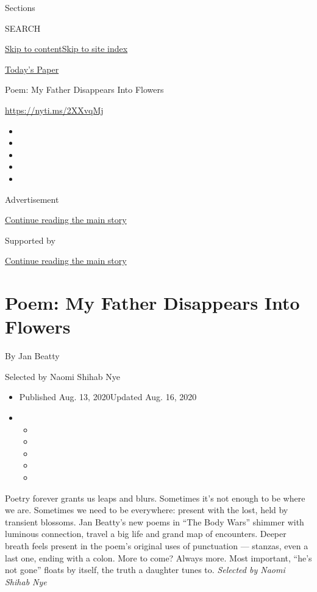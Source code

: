Sections

SEARCH

\protect\hyperlink{site-content}{Skip to
content}\protect\hyperlink{site-index}{Skip to site index}

\href{https://myaccount.nytimes3xbfgragh.onion/auth/login?response_type=cookie\&client_id=vi}{}

\href{https://www.nytimes3xbfgragh.onion/section/todayspaper}{Today's
Paper}

Poem: My Father Disappears Into Flowers

\url{https://nyti.ms/2XXvqMj}

\begin{itemize}
\item
\item
\item
\item
\item
\end{itemize}

Advertisement

\protect\hyperlink{after-top}{Continue reading the main story}

Supported by

\protect\hyperlink{after-sponsor}{Continue reading the main story}

\hypertarget{poem-my-father-disappears-into-flowers}{%
\section{Poem: My Father Disappears Into
Flowers}\label{poem-my-father-disappears-into-flowers}}

By Jan Beatty

Selected by Naomi Shihab Nye

\begin{itemize}
\item
  Published Aug. 13, 2020Updated Aug. 16, 2020
\item
  \begin{itemize}
  \item
  \item
  \item
  \item
  \item
  \end{itemize}
\end{itemize}

Poetry forever grants us leaps and blurs. Sometimes it's not enough to
be where we are. Sometimes we need to be everywhere: present with the
lost, held by transient blossoms. Jan Beatty's new poems in ``The Body
Wars'' shimmer with luminous connection, travel a big life and grand map
of encounters. Deeper breath feels present in the poem's original uses
of punctuation --- stanzas, even a last one, ending with a colon. More
to come? Always more. Most important, ``he's not gone'' floats by
itself, the truth a daughter tunes to. \emph{Selected by Naomi Shihab
Nye}

